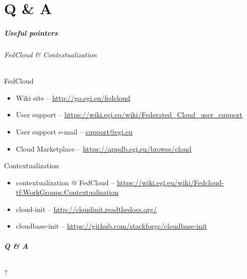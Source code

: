 \part{Q \& A}


\begin{frame}
  \frametitle{Useful pointers}
  \framesubtitle{FedCloud \& Contextualization}

  \Fontsmaller

  \begin{block}{FedCloud}
  \begin{itemize}
    \item Wiki site -- \url{http://go.egi.eu/fedcloud}
    \item User support -- \url{https://wiki.egi.eu/wiki/Federated\_Cloud\_user\_support}
    \item User support e-mail -- \url{support@egi.eu}
    \item Cloud Marketplace -- \url{https://appdb.egi.eu/browse/cloud}
  \end{itemize}
  \end{block}

  \begin{block}{Contextualization}
  \begin{itemize}
    \item contextualization @ FedCloud -- \url{https://wiki.egi.eu/wiki/Fedcloud-tf:WorkGroups:Contextualisation}
    \item cloud-init -- \url{http://cloudinit.readthedocs.org/}
    \item cloudbase-init -- \url{https://github.com/stackforge/cloudbase-init}
  \end{itemize}
  \end{block}
\end{frame}


\begin{frame}
  \frametitle{Q \& A}
  \framesubtitle{}

  \begin{center}
    {\Huge ?}
  \end{center}
\end{frame}
